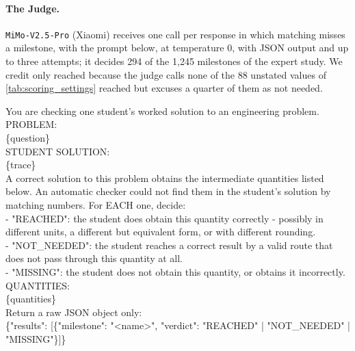 \paragraph{The Judge.} \texttt{MiMo-V2.5-Pro} (Xiaomi) receives one call per response in which
matching misses a milestone, with the prompt below, at temperature 0, with JSON output and up to
three attempts; it decides 294 of the 1,245 milestones of the expert study.
We credit only reached because the judge calls none of the 88 unstated values of
\autoref{tab:scoring_settings} reached but excuses a quarter of them as not needed.

\begin{tcolorbox}[
    colback=gray!5,
    colframe=gray!40,
    boxrule=0.4pt,
    arc=2pt,
    left=6pt,
    right=6pt,
    top=6pt,
    bottom=6pt,
    breakable
]
\footnotesize
\ttfamily
You are checking one student's worked solution to an engineering problem. \\

PROBLEM: \\
\{question\} \\

STUDENT SOLUTION: \\
\{trace\} \\

A correct solution to this problem obtains the intermediate quantities listed below.
An automatic checker could not find them in the student's solution by matching numbers.
For EACH one, decide: \\

- "REACHED": the student does obtain this quantity correctly - possibly in different units, a
different but equivalent form, or with different rounding. \\
- "NOT\_NEEDED": the student reaches a correct result by a valid route that does not pass through
this quantity at all. \\
- "MISSING": the student does not obtain this quantity, or obtains it incorrectly. \\

QUANTITIES: \\
\{quantities\} \\

Return a raw JSON object only: \\
\{"results": [\{"milestone": "\textless name\textgreater", "verdict": "REACHED" | "NOT\_NEEDED" |
"MISSING"\}]\}
\end{tcolorbox}

